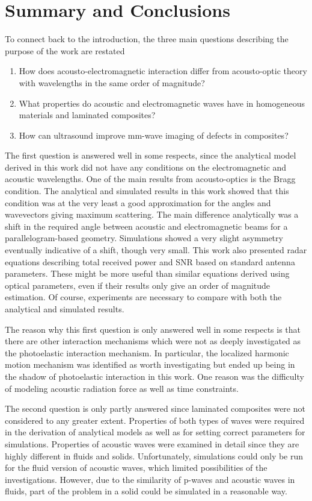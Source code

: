 \documentclass[11pt,twoside]{eitExjobb}
\begin{document}
	\section{Summary and Conclusions}
	To connect back to the introduction, the three main questions describing the purpose of the work are restated
	\begin{enumerate}
		\item How does acousto-electromagnetic interaction differ from acousto-optic theory with wavelengths in the same order of magnitude?
		\item What properties do acoustic and electromagnetic waves have in homogeneous materials and laminated composites?
		\item How can ultrasound improve mm-wave imaging of defects in composites?
	\end{enumerate}
	The first question is answered well in some respects, since the analytical model derived in this work did not have any conditions on the electromagnetic and acoustic wavelengths. One of the main results from acousto-optics is the Bragg condition. The analytical and simulated results in this work showed that this condition was at the very least a good approximation for the angles and wavevectors giving maximum scattering. The main difference analytically was a shift in the required angle between acoustic and electromagnetic beams for a parallelogram-based geometry. Simulations showed a very slight asymmetry eventually indicative of a shift, though very small. This work also presented radar equations describing total received power and SNR based on standard antenna parameters. These might be more useful than similar equations derived using optical parameters, even if their results only give an order of magnitude estimation. Of course, experiments are necessary to compare with both the analytical and simulated results.
	
	The reason why this first question is only answered well in some respects is that there are other interaction mechanisms which were not as  deeply investigated as the photoelastic interaction mechanism. In particular, the localized harmonic motion mechanism was identified as worth investigating but ended up being in the shadow of photoelastic interaction in this work. One reason was the difficulty of modeling acoustic radiation force as well as time constraints.
	
	The second question is only partly answered since laminated composites were not considered to any greater extent. Properties of both types of waves were required in the derivation of analytical models as well as for setting correct parameters for simulations. Properties of acoustic waves were examined in detail since they are highly different in fluids and solids. Unfortunately, simulations could only be run for the fluid version of acoustic waves, which limited possibilities of the investigations. However, due to the similarity of p-waves and acoustic waves in fluids, part of the problem in a solid could be simulated in a reasonable way.
	
\end{document}
